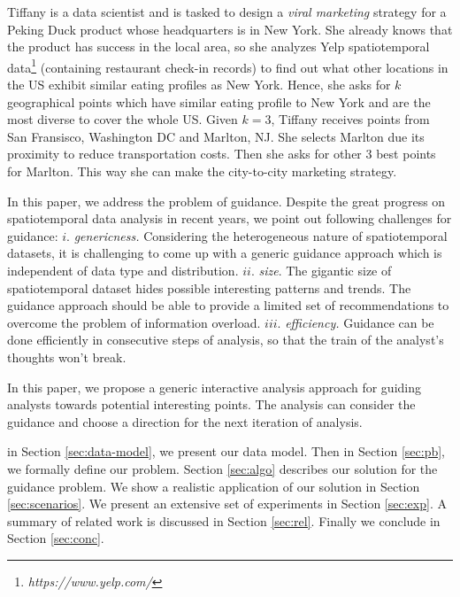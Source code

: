 \begin{example}
\label{ex:flight}
Tiffany is a data scientist and is tasked to design a {\em viral marketing} strategy for a Peking Duck product whose headquarters is in New York. She already knows that the product has success in the local area, so she analyzes Yelp spatiotemporal data\footnote{\it https://www.yelp.com/} (containing restaurant check-in records) to find out what other locations in the US exhibit similar eating profiles as New York. Hence, she asks for $k$ geographical points which have similar eating profile to New York and are the most diverse to cover the whole US. Given $k=3$, Tiffany receives points from San Fransisco, Washington DC and Marlton, NJ. She selects Marlton due its proximity to reduce transportation costs. Then she asks for other 3 best points for Marlton. This way she can make the city-to-city marketing strategy.
\end{example}

 In this paper, we address the problem of guidance. Despite the great progress on spatiotemporal data analysis in recent years, we point out following challenges for guidance: $i.$ {\em genericness.} Considering the heterogeneous nature of spatiotemporal datasets, it is challenging to come up with a generic guidance approach which is independent of data type and distribution. $ii.$ {\em size}. The gigantic size of spatiotemporal dataset hides possible interesting patterns and trends. The guidance approach should be able to provide a limited set of recommendations to overcome the problem of information overload. $iii.$ {\em efficiency.} Guidance can be done efficiently in consecutive steps of analysis, so that the train of the analyst's thoughts won’t break.

\vspace{5pt}
In this paper, we propose a generic interactive analysis approach for guiding analysts towards potential interesting points. The analysis can consider the guidance and choose a direction for the next iteration of analysis. 

\vspace{5pt}
 in Section \ref{sec:data-model}, we
present our data model. Then in Section \ref{sec:pb}, we formally define our problem. Section \ref{sec:algo} describes our solution for the guidance problem. We show a realistic application of our solution in Section \ref{sec:scenarios}. We present an extensive set of experiments in Section \ref{sec:exp}. A summary of related work is discussed in Section \ref{sec:rel}. Finally we conclude in Section \ref{sec:conc}.